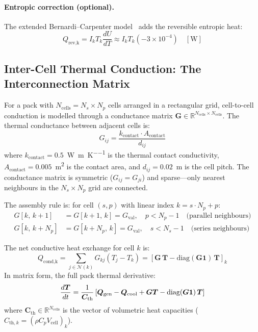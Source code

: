 \paragraph{Entropic correction (optional).} The extended Bernardi--Carpenter model~\cite{Bernardi1985} adds the reversible entropic heat:
\begin{equation}
  Q_\text{rev,k} = I_k T_k \frac{dU}{dT} \approx I_k T_k (-3\times10^{-4}) \quad [\si{\watt}]
  \label{eq:Q_rev}
\end{equation}

\subsection{Inter-Cell Thermal Conduction: The Interconnection Matrix}
\label{ssec:thermal_matrix}

For a pack with $N_\text{cells} = N_s \times N_p$ cells arranged in a rectangular grid, cell-to-cell conduction is modelled through a conductance matrix $\boldsymbol{G} \in \mathbb{R}^{N_\text{cells} \times N_\text{cells}}$. The thermal conductance between adjacent cells is:
\begin{equation}
  G_{ij} = \frac{k_\text{contact} \cdot A_\text{contact}}{d_{ij}}
  \label{eq:Gij}
\end{equation}
where $k_\text{contact} = 0.5$~\si{\watt\per\meter\per\kelvin} is the thermal contact conductivity, $A_\text{contact} = 0.005$~\si{\meter\squared} is the contact area, and $d_{ij} = 0.02$~m is the cell pitch. The conductance matrix is symmetric ($G_{ij} = G_{ji}$) and sparse---only nearest neighbours in the $N_s \times N_p$ grid are connected.

The assembly rule is: for cell $(s, p)$ with linear index $k = s \cdot N_p + p$:
\begin{align}
  G[k,\, k{+}1] &= G[k{+}1,\, k] = G_\text{val}, \quad p < N_p - 1 \quad\text{(parallel neighbours)} \label{eq:G_parallel}\\
  G[k,\, k{+}N_p] &= G[k{+}N_p,\, k] = G_\text{val}, \quad s < N_s - 1 \quad\text{(series neighbours)} \label{eq:G_series}
\end{align}

The net conductive heat exchange for cell $k$ is:
\begin{equation}
  Q_\text{cond,k} = \sum_{j \in \mathcal{N}(k)} G_{kj}(T_j - T_k) = \left[\boldsymbol{G}\,\boldsymbol{T} - \text{diag}(\boldsymbol{G}\mathbf{1})\,\boldsymbol{T}\right]_k
  \label{eq:Q_cond}
\end{equation}
In matrix form, the full pack thermal derivative:
\begin{equation}
  \dfrac{d \boldsymbol{T}}{dt} = \frac{1}{\boldsymbol{C}_\text{th}}\left[\boldsymbol{Q}_\text{gen} - \boldsymbol{Q}_\text{cool} + \boldsymbol{G}\boldsymbol{T} - \text{diag}\!\left(\boldsymbol{G}\mathbf{1}\right)\boldsymbol{T}\right]
  \label{eq:thermal_matrix_ode}
\end{equation}
where $\boldsymbol{C}_\text{th} \in \mathbb{R}^{N_\text{cells}}$ is the vector of volumetric heat capacities ($C_{\text{th},k} = (\rho C_p V_\text{cell})_k$).

